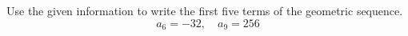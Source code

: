 \documentclass[11pt,addpoints,answers]{exam}
\newcommand{\+}{\, \, + \, \, }
\renewcommand{\-}{\, \, - \, \, }
\renewcommand{\=}{\, \, = \, \, }
\begin{document}
\begin{questions}
\begin{multicols}{5}
\columnbreak

\begin{flushright}\end{flushright}
\end{multicols}

\question[10] Use the given information to write the first five terms of the geometric sequence.
\[a_6 = -32, \quad a_9 = 256\]
\vspace{1in}

\begin{multicols}{5}

\begin{flushright}\end{flushright}

\columnbreak

\begin{flushright}\end{flushright}

\columnbreak

\begin{flushright}\end{flushright}

\columnbreak

\begin{flushright}\end{flushright}

\columnbreak

\begin{flushright}\end{flushright}
\end{multicols}


\end{questions}
\end{document}
